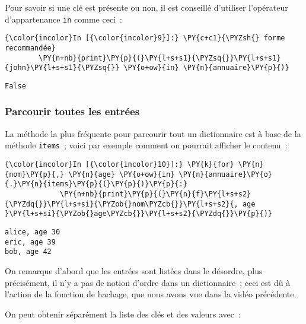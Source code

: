     Pour savoir si une clé est présente ou non, il est conseillé d'utiliser
l'opérateur d'appartenance \texttt{in} comme ceci~:

    \begin{Verbatim}[commandchars=\\\{\}]
{\color{incolor}In [{\color{incolor}9}]:} \PY{c+c1}{\PYZsh{} forme recommandée}
        \PY{n+nb}{print}\PY{p}{(}\PY{l+s+s1}{\PYZsq{}}\PY{l+s+s1}{john}\PY{l+s+s1}{\PYZsq{}} \PY{o+ow}{in} \PY{n}{annuaire}\PY{p}{)}
\end{Verbatim}


    \begin{Verbatim}[commandchars=\\\{\}]
False

    \end{Verbatim}

    \hypertarget{parcourir-toutes-les-entruxe9es}{%
\subsubsection{Parcourir toutes les
entrées}\label{parcourir-toutes-les-entruxe9es}}

    La méthode la plus fréquente pour parcourir tout un dictionnaire est à
base de la méthode \texttt{items}~; voici par exemple comment on
pourrait afficher le contenu~:

    \begin{Verbatim}[commandchars=\\\{\}]
{\color{incolor}In [{\color{incolor}10}]:} \PY{k}{for} \PY{n}{nom}\PY{p}{,} \PY{n}{age} \PY{o+ow}{in} \PY{n}{annuaire}\PY{o}{.}\PY{n}{items}\PY{p}{(}\PY{p}{)}\PY{p}{:}
             \PY{n+nb}{print}\PY{p}{(}\PY{n}{f}\PY{l+s+s2}{\PYZdq{}}\PY{l+s+si}{\PYZob{}nom\PYZcb{}}\PY{l+s+s2}{, age }\PY{l+s+si}{\PYZob{}age\PYZcb{}}\PY{l+s+s2}{\PYZdq{}}\PY{p}{)}
\end{Verbatim}


    \begin{Verbatim}[commandchars=\\\{\}]
alice, age 30
eric, age 39
bob, age 42

    \end{Verbatim}

    On remarque d'abord que les entrées sont listées dans le désordre, plus
précisément, il n'y a pas de notion d'ordre dans un dictionnaire~; ceci
est dû à l'action de la fonction de hachage, que nous avons vue dans la
vidéo précédente.

    On peut obtenir séparément la liste des clés et des valeurs avec~:

